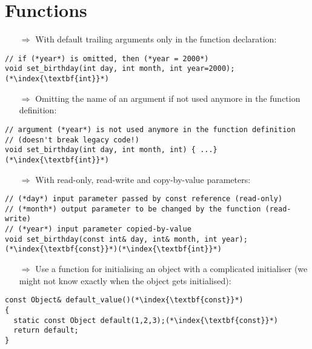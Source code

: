 \documentclass[10pt]{article}
\begin{document}
\section{Functions}
\small
\begin{enumerate}
\item[$\Rightarrow$] With default trailing arguments only in the function declaration:
\end{enumerate}
\begin{lstlisting}
// if (*year*) is omitted, then (*year = 2000*)
void set_birthday(int day, int month, int year=2000);(*\index{\textbf{int}}*)
\end{lstlisting}
\begin{enumerate}
\item[$\Rightarrow$] Omitting the name of an argument if not used anymore in the function definition:
\end{enumerate}
\begin{lstlisting}
// argument (*year*) is not used anymore in the function definition
// (doesn't break legacy code!)
void set_birthday(int day, int month, int) { ...}(*\index{\textbf{int}}*)
\end{lstlisting}
\begin{enumerate}
\item[$\Rightarrow$] With read-only, read-write and copy-by-value parameters:
\end{enumerate}
\begin{lstlisting}
// (*day*) input parameter passed by const reference (read-only)
// (*month*) output parameter to be changed by the function (read-write)
// (*year*) input parameter copied-by-value
void set_birthday(const int& day, int& month, int year);(*\index{\textbf{const}}*)(*\index{\textbf{int}}*)
\end{lstlisting}
\begin{enumerate}
\item[$\Rightarrow$] Use a function for initialising an object with a complicated initialiser (we might not
know exactly when the object gets initialised):
\end{enumerate}
\begin{lstlisting}
const Object& default_value()(*\index{\textbf{const}}*)
{
  static const Object default(1,2,3);(*\index{\textbf{const}}*)
  return default;
}
\end{lstlisting}
\end{document}
